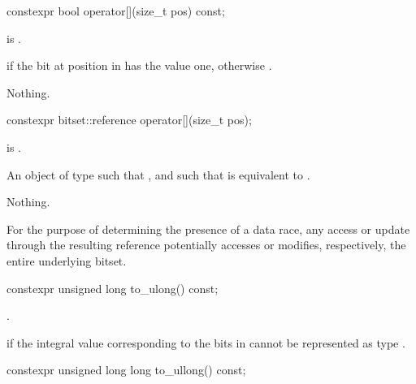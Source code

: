 %
\begin{itemdecl}
constexpr bool operator[](size_t pos) const;
\end{itemdecl}

\begin{itemdescr}
\pnum
\hardexpects
{} is .

\pnum
\returns
{} if the bit at position  in  has the value
one, otherwise .

\pnum
\throws
Nothing.
\end{itemdescr}

%
\begin{itemdecl}
constexpr bitset::reference operator[](size_t pos);
\end{itemdecl}

\begin{itemdescr}
\pnum
\hardexpects
{} is .

\pnum
\returns
An object of type
such that
,
and such that
is equivalent to
.

\pnum
\throws
Nothing.

\pnum
\remarks
For the purpose of determining the presence of a data
race, any access or update through the resulting
reference potentially accesses or modifies, respectively, the entire
underlying bitset.
\end{itemdescr}

%
\begin{itemdecl}
constexpr unsigned long to_ulong() const;
\end{itemdecl}

\begin{itemdescr}
\pnum
\returns
{}.

\pnum
\throws
{}%
 if the integral value 
corresponding to the bits in 
cannot be represented as type .
\end{itemdescr}

%
\begin{itemdecl}
constexpr unsigned long long to_ullong() const;
\end{itemdecl}

